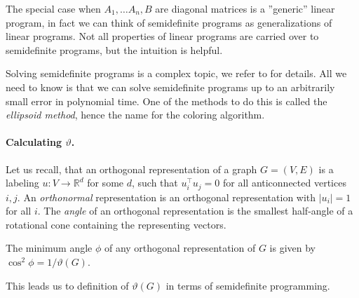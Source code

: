 The special case when $A_1, \ldots A_n, B$ are diagonal matrices is a ''generic'' linear program, in fact we can think of semidefinite programs as generalizations of linear programs. Not all properties of linear programs are carried over to semidefinite programs, but the intuition is helpful.

Solving semidefinite programs is a complex topic, we refer to \cite{grotschel1993} for details. All we need to know is that we can solve semidefinite programs up to an arbitrarily small error in polynomial time. One of the methods to do this is called the \emph{ellipsoid method}, hence the name for the coloring algorithm.

\paragraph{Calculating \boldmath$\vartheta$.}

Let us recall, that an orthogonal representation of a graph $G = (V, E)$ is a labeling $u: V \rightarrow \mathbb{R}^d$ for some $d$, such that $u_i^\intercal u_j = 0$ for all anticonnected vertices $i, j$. An \emph{orthonormal} representation is an orthogonal representation with $|u_i| = 1$ for all $i$. The \emph{angle} of an orthogonal representation is the smallest half-angle of a rotational cone containing the representing vectors.

\begin{theorem}
  The minimum angle $\phi$ of any orthogonal representation of $G$ is given by $\cos^2\phi = 1/\vartheta(G)$.
\end{theorem}

This leads us to definition of $\vartheta(G)$ in terms of semidefinite programming.

